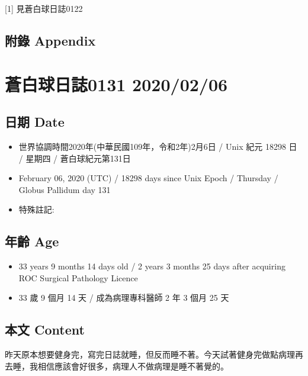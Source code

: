 \documentclass[
]{article}
\providecommand{\tightlist}{%
  \setlength{\itemsep}{0pt}\setlength{\parskip}{0pt}}
\begin{document}
{[}1{]} 見蒼白球日誌0122

\hypertarget{ux9644ux9304-appendix-66}{%
\subsection{附錄 Appendix}\label{ux9644ux9304-appendix-66}}

\hypertarget{ux84bcux767dux7403ux65e5ux8a8c0131-20200206}{%
\section{蒼白球日誌0131
2020/02/06}\label{ux84bcux767dux7403ux65e5ux8a8c0131-20200206}}

\hypertarget{ux65e5ux671f-date-67}{%
\subsection{日期 Date}\label{ux65e5ux671f-date-67}}

\begin{itemize}
\tightlist
\item
  世界協調時間2020年(中華民國109年，令和2年)2月6日 / Unix 紀元 18298 日
  / 星期四 / 蒼白球紀元第131日
\item
  February 06, 2020 (UTC) / 18298 days since Unix Epoch / Thursday /
  Globus Pallidum day 131
\item
  特殊註記:
\end{itemize}

\hypertarget{ux5e74ux9f61-age-67}{%
\subsection{年齡 Age}\label{ux5e74ux9f61-age-67}}

\begin{itemize}
\tightlist
\item
  33 years 9 months 14 days old / 2 years 3 months 25 days after
  acquiring ROC Surgical Pathology Licence
\item
  33 歲 9 個月 14 天 / 成為病理專科醫師 2 年 3 個月 25 天
\end{itemize}

\hypertarget{ux672cux6587-content-67}{%
\subsection{本文 Content}\label{ux672cux6587-content-67}}

昨天原本想要健身完，寫完日誌就睡，但反而睡不著。今天試著健身完做點病理再去睡，我相信應該會好很多，病理人不做病理是睡不著覺的。
\end{document}
